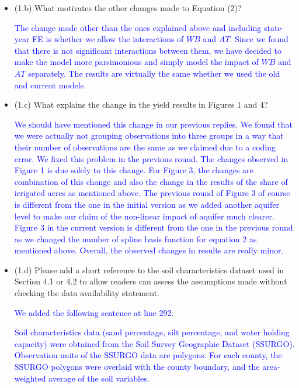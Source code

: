 \documentclass[
]{article}
\begin{document}
\begin{itemize}
\begin{itemize}
  \item (1.b) What motivates the other changes made to Equation (2)?

  \textcolor{blue}{The change made other than the ones explained above and including state-year FE is whether we allow the interactions of $WB$ and $AT$. Since we found that there is not significant interactions between them, we have decided to make the model more parsimonious and simply model the impact of $WB$ and $AT$ separately. The results are virtually the same whether we used the old and current models.}
  
  \item (1.c) What explains the change in the yield results in Figures 1 and 4?

  \textcolor{blue}{We should have mentioned this change in our previous replies. We found that we were actually not grouping observations into three groups in a way that their number of observations are the same as we claimed due to a coding error. We fixed this problem in the previous round. The changes observed in Figure 1 is due solely to this change. For Figure 3, the changes are combination of this change and also the change in the results of the share of irrigated acres as mentioned above. The previous round of Figure 3 of course is different from the one in the initial version as we added another aquifer level to make our claim of the non-linear impact of aquifer much clearer. Figure 3 in the current version is different from the one in the previous round as we changed the number of spline basis function for equation 2 as mentioned above. Overall, the observed changes in results are really minor.} 
  
  \item (1.d) Please add a short reference to the soil characteristics dataset used in Section 4.1 or 4.2 to allow readers can assess the assumptions made without checking the data availability statement.

  \textcolor{blue}{We added the following sentence at line 292.}
  
  \textcolor{blue}{Soil characteristics data (sand percentage, silt percentage, and water holding capacity) were obtained from the Soil Survey Geographic Dataset (SSURGO). Observation units of the SSURGO data are polygons. For each county, the SSURGO polygons were overlaid with the county boundary, and the area-weighted average of the soil variables.}

  \end{itemize}


\end{itemize}
\end{document}
